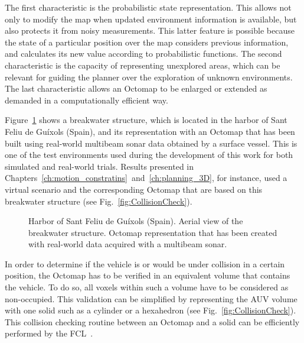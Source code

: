 The first characteristic is the probabilistic state representation. This allows
not only to modify the map when updated environment information is available,
but also protects it from noisy measurements. This latter feature is possible
because the state of a particular position over the map considers previous
information, and calculates its new value according to probabilistic functions.
The second characteristic is the capacity of representing unexplored areas,
which can be relevant for guiding the planner over the exploration of unknown
environments. The last characteristic allows an Octomap to be enlarged or
extended as demanded in a computationally efficient way.

Figure~\ref{fig:SantFeliuBlocksOctomap} shows a breakwater structure, which is
located in the harbor of Sant Feliu de Gu\'ixols (Spain), and its representation
with an Octomap that has been built using real-world multibeam sonar data
obtained by a surface vessel. This is one of the test environments used during
the development of this work for both simulated and real-world trials. Results
presented in Chapters~\ref{ch:motion_constratins}~and~\ref{ch:planning_3D}, for
instance, used a virtual scenario and the corresponding Octomap that are based
on this breakwater structure (see Fig.~\ref{fig:CollisionCheck}).

\begin{figure}[htbp]
\myfloatalign
     \quad
\caption[Harbor of Sant Feliu de Gu\'ixols (Spain). Aerial view of the
breakwater structure, and a representation of the area with an Octomap.]
{Harbor of Sant Feliu de Gu\'ixols (Spain).
\protect {} Aerial view of the breakwater structure.
\protect {} Octomap representation that has been
created with real-world data acquired with a multibeam sonar.}
\label{fig:SantFeliuBlocksOctomap}
\end{figure}

In order to determine if the vehicle is or would be under collision in a certain
position, the Octomap has to be verified in an equivalent volume that contains
the vehicle. To do so, all voxels within such a volume have to be considered as
non-occupied. This validation can be simplified by representing the \ac{AUV}
volume with one solid such as a cylinder or a hexahedron (see
Fig.~\ref{fig:CollisionCheck}). This collision checking routine between an
Octomap and a solid can be efficiently performed by the \ac{FCL}~\cite{fcl}.

